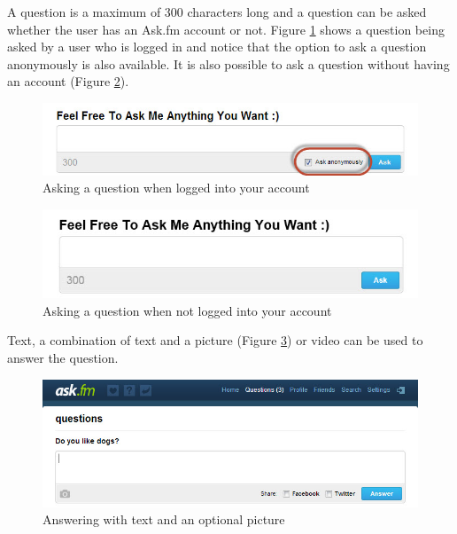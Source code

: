 A question is a maximum of 300 characters long and a question can be asked whether the user has an Ask.fm account or not. Figure \ref{fig:askquestion_01} shows a question being asked by a user who is logged in and notice that the option to ask a question anonymously is also available. It is also possible to ask a question without having an account (Figure \ref{fig:askquestion_02}).

\begin{figure}[h!]
	\centering
	\includegraphics[scale=0.5]{Figures/Chapter2/AskQuestion_01.jpg}
	\caption{Asking a question when logged into your account}
	\label{fig:askquestion_01}
\end{figure}


\begin{figure}[h!]
	\centering
	\includegraphics[scale=0.46]{Figures/Chapter2/AskQuestion_02.jpg}
	\caption{Asking a question when not logged into your account}
	\label{fig:askquestion_02}
\end{figure}

Text, a combination of text and a picture (Figure \ref{fig:answer}) or video can be used to answer the question.

\begin{figure}[h!]
	\centering
	\includegraphics[scale=0.5]{Figures/Chapter2/Answer.jpg}
	\caption{Answering with text and an optional picture}
	\label{fig:answer}
\end{figure}

